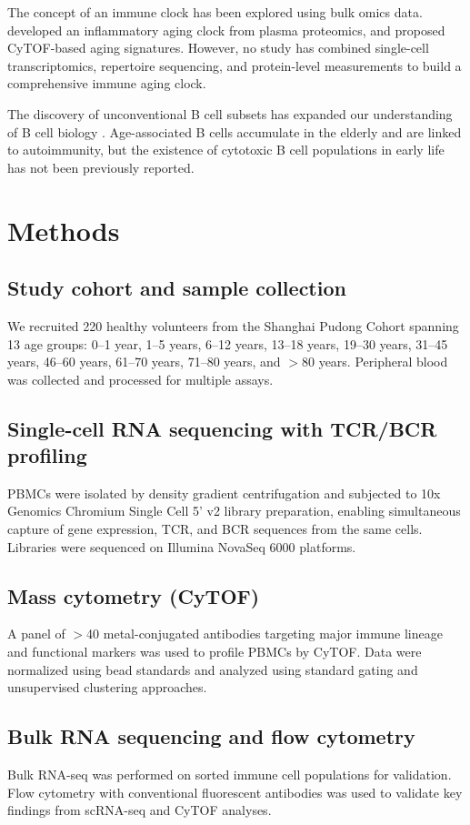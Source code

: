 \documentclass[11pt]{article}
\begin{document}
The concept of an immune clock has been explored using bulk omics data. \citet{sayed2021immuneclock} developed an inflammatory aging clock from plasma proteomics, and \citet{alpert2019multi} proposed CyTOF-based aging signatures. However, no study has combined single-cell transcriptomics, repertoire sequencing, and protein-level measurements to build a comprehensive immune aging clock.

The discovery of unconventional B cell subsets has expanded our understanding of B cell biology \citep{glass2020unconventional}. Age-associated B cells accumulate in the elderly and are linked to autoimmunity, but the existence of cytotoxic B cell populations in early life has not been previously reported.

\section{Methods}

\subsection{Study cohort and sample collection}
We recruited 220 healthy volunteers from the Shanghai Pudong Cohort spanning 13 age groups: 0--1 year, 1--5 years, 6--12 years, 13--18 years, 19--30 years, 31--45 years, 46--60 years, 61--70 years, 71--80 years, and $>$80 years. Peripheral blood was collected and processed for multiple assays.

\subsection{Single-cell RNA sequencing with TCR/BCR profiling}
PBMCs were isolated by density gradient centrifugation and subjected to 10x Genomics Chromium Single Cell 5' v2 library preparation, enabling simultaneous capture of gene expression, TCR, and BCR sequences from the same cells. Libraries were sequenced on Illumina NovaSeq 6000 platforms.

\subsection{Mass cytometry (CyTOF)}
A panel of $>$40 metal-conjugated antibodies targeting major immune lineage and functional markers was used to profile PBMCs by CyTOF. Data were normalized using bead standards and analyzed using standard gating and unsupervised clustering approaches.

\subsection{Bulk RNA sequencing and flow cytometry}
Bulk RNA-seq was performed on sorted immune cell populations for validation. Flow cytometry with conventional fluorescent antibodies was used to validate key findings from scRNA-seq and CyTOF analyses.
\end{document}

